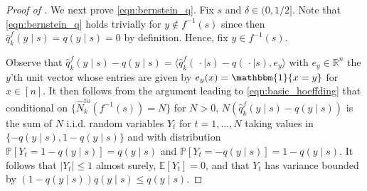 \documentclass[10pt,a4paper]{amsart}
\newcommand{\mbbE}{\mathbb{E}}
\newcommand{\mbbP}{\mathbb{P}}
\newcommand{\mbbR}{\mathbb{R}}
\begin{document}
\begin{proof}[Proof of ]
	We next prove \eqref{eqn:bernstein_q}.
	Fix $s$ and $\delta \in(0,1/2]$.
	Note that \eqref{eqn:bernstein_q} holds trivially for $y\notin f^{-1}(s)$ since then $\hat{q}_k^f(y\mid s) = q(y\mid s) = 0$ by definition.
	Hence, fix $y\in f^{-1}(s)$.

	Observe that $\hat{q}_k^f(y\mid s)-q(y\mid s)=\langle\hat{q}_k^f(\,\cdot \mid s)-q(\,\cdot \mid s),e_y\rangle$ with $e_y\in\mbbR^n$ the $y$'th unit vector whose entries are given by $e_y(x)=\mathbbm{1}\{x=y\}$ for $x\in[n]$.
	It then follows from the argument leading to \eqref{eqn:basic_hoeffding} that conditional on $\{\hat{N}^{\mathrm{to}}_k(f^{-1}(s))=N\}$ for $N>0$, $N(\hat{q}^f_k(y\mid s)-q(y\mid s))$ is the sum of $N$ i.i.d. random variables $Y_t$ for $t=1,\ldots,N$ taking values in $\{-q(y\mid s),1-q(y\mid s)\}$ and with distribution $\mbbP[Y_t=1-q(y\mid s)]=q(y\mid s)$ and $\mbbP[Y_t = -q(y\mid s)]=1-q(y\mid s)$.
	It follows that $|Y_t|\leq 1$ almost surely, $\mbbE[Y_t]=0$, and that $Y_t$ has variance bounded by $(1-q(y\mid s))q(y\mid s)\leq q(y\mid s)$.


\end{proof}
\end{document}
